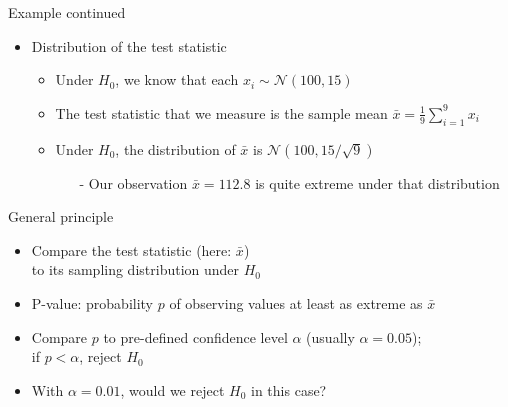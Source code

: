 \begin{frame}[c]{Example continued}

\begin{itemize}

\item \alert{Distribution of the test statistic} 
\begin{itemize}
\item Under $H_0$, we know that each $x_i \sim \mathcal{N}(100,15)$
\smallskip
\item The \alert{test statistic} that we measure is the sample
mean $\bar{x} = \frac{1}{9} \sum_{i=1}^9 x_i$
\bigskip
\pause
\item Under $H_0$, the distribution of $\bar{x}$ is
$\mathcal{N}(100,15/\sqrt{9})$
\begin{itemize}
\item[-] Our observation $\bar{x}=112.8$ is quite extreme under that
distribution
\end{itemize}
\end{itemize}	
\end{itemize}

\begin{center}

\end{center}

\end{frame}
\begin{frame}[c]{General principle}

\vspace*{-0.2cm}
\begin{center}

\end{center}
\vspace*{-0.2cm}

\begin{itemize}
\item Compare the test statistic (here: $\bar{x}$)\\to its sampling
distribution under $H_0$
\pause 
\medskip
\item \alert{P-value}: probability $p$ of observing values \alert{at least as extreme as $\bar{x}$}\\
\pause 
\medskip
\item Compare $p$ to pre-defined confidence level $\alpha$ (usually
$\alpha=0.05$);\\\alert{if $p < \alpha$, reject $H_0$}
\pause 
\medskip
\item With $\alpha = 0.01$, would we reject $H_0$ in this case? \hands
\end{itemize}

\end{frame}
